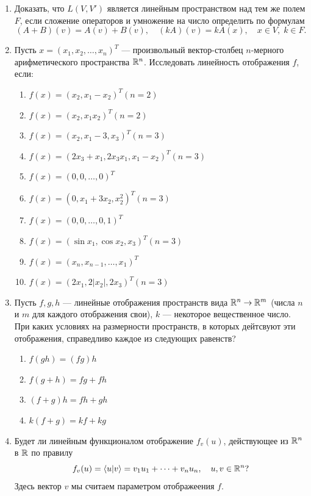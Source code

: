 \begin{enumerate}
\item Доказать, что $L(V,V')$ является линейным пространством над тем же полем $F$, если сложение операторов и умножение на число определить по формулам
$$
(A+B)(v) = A(v)+B(v),\quad (kA)(v) = kA(x),\quad x\in V,\; k\in F.
$$

\item  Пусть $x = (x_1, x_2, \dots, x_n)^T$ --- произвольный вектор-столбец $n$-мерного
арифметического пространства $\mathbb R^n$. Исследовать линейность отображения $f$, если: \label{linop}
\begin{enumerate}
\item $f(x) = (x_2, x_1 - x_2)^T (n = 2)$
\item $f(x) = (x_2, x_1 x_2)^T (n = 2)$
\item $f(x) = (x_2, x_1 - 3, x_3)^T (n = 3)$
\item $f(x) = (2x_3 + x_1, 2x_3 x_1, x_1 - x_2)^T (n = 3)$
\item $f(x) = (0, 0, \dots , 0)^T$
\item $f(x) = (0, x_1 + 3x_2, x_2^2)^T (n = 3)$
\item $f(x) = (0, 0, \dots, 0, 1)^T$
\item $f(x) = (\sin x_1, \cos x_2, x_3)^T (n = 3)$
\item $f(x) = (x_n, x_{n-1}, \dots, x_1)^T$
\item $f(x) = (2x_1, 2|x_2|, 2x_3)^T (n = 3)$
\end{enumerate}

\item Пусть $f, g, h$ --- линейные отображения пространств вида $\mathbb R^n\to\mathbb R^m$ (числа $n$ и $m$ для каждого отображения свои), $k$ --- некоторое вещественное число.
При каких условиях на размерности пространств, в которых дейтсвуют эти отображения, справедливо каждое из следующих равенств?
\begin{enumerate}
\item $f(gh) = (fg)h$
\item $f(g + h) = fg + fh$
\item $(f + g)h = fh + gh$
\item $k(f + g) = kf + kg$
\end{enumerate}

\item Будет ли линейным функционалом отображение $f_v(u)$, действующее из $\mathbb R^n$ в $\mathbb R$ по правилу
$$
f_v(u)= \langle u|v\rangle = v_1u_1+\dots+v_nu_n,\quad u,v\in \mathbb R^n?
$$
Здесь вектор $v$ мы считаем параметром отображеения $f$.


\end{enumerate}
